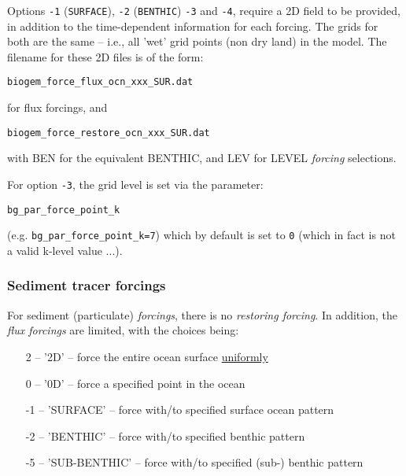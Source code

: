 \vspace{1mm}

Options \texttt{-1} (\texttt{SURFACE}), \texttt{-2} (\texttt{BENTHIC}) \texttt{-3} and  \texttt{-4}, require a 2D field to be provided, in addition to the time-dependent information for each forcing. The grids for both are the same -- i.e., all 'wet' grid points (non dry land) in the model. The filename for these 2D files is of the form:
\vspace{-1mm}\small\begin{verbatim}
biogem_force_flux_ocn_xxx_SUR.dat
\end{verbatim}\normalsize\vspace{-1mm}
for flux forcings, and
\vspace{-1mm}\small\begin{verbatim}
biogem_force_restore_ocn_xxx_SUR.dat
\end{verbatim}\normalsize\vspace{-1mm}
with \textsf{\footnotesize BEN} for the equivalent BENTHIC, and \textsf{\footnotesize LEV} for LEVEL \textit{forcing} selections.

\vspace{2mm}

For option \texttt{-3}, the grid level is set via the parameter:
\vspace{-2mm}\small\begin{verbatim}
bg_par_force_point_k
\end{verbatim}\normalsize\vspace{-2mm}
(e.g. \texttt{bg\_par\_force\_point\_k=7}) which by default is set to \texttt{0} (which in fact is not a valid k-level value ...).

\newpage

\subsubsection*{Sediment tracer forcings}

\vspace{1mm}

For sediment (particulate) \textit{forcings}, there is no \textit{restoring forcing}. In addition, the \textit{flux forcings} are limited, with the choices being:
\vspace{1mm}
\begin{itemize}[noitemsep]
\item [2] -- '2D' -- force the entire ocean surface \uline{uniformly}
\item [0] -- '0D' -- force a specified point in the ocean
\item [-1] -- 'SURFACE' -- force with/to specified surface ocean pattern
\item [-2] -- 'BENTHIC' -- force with/to specified benthic pattern
\item [-5] -- 'SUB-BENTHIC' -- force with/to specified (sub-) benthic pattern
\end{itemize}
\vspace{1mm}

